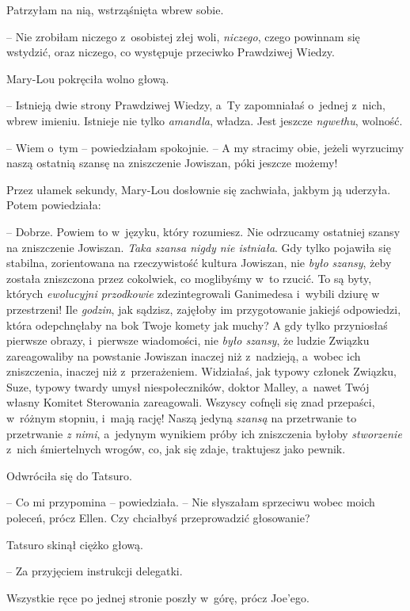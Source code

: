 \documentclass[oneside,polish,11pt,sfheadings]{mwbk}
\begin{document}
Patrzyłam na nią, wstrząśnięta wbrew sobie. 

-- Nie zrobiłam niczego z~osobistej złej woli, \textit{niczego}, czego powinnam się wstydzić, oraz
niczego, co występuje przeciwko Prawdziwej Wiedzy.

Mary-Lou pokręciła wolno głową. 

-- Istnieją dwie strony Prawdziwej
Wiedzy, a~Ty zapomniałaś o~jednej z~nich, wbrew imieniu. Istnieje nie
tylko \textit{amandla}, władza. Jest jeszcze \textit{ngwethu}, wolność.

-- Wiem o~tym -- powiedziałam spokojnie. -- A my stracimy obie, jeżeli
wyrzucimy naszą ostatnią szansę na zniszczenie Jowiszan, póki jeszcze
możemy!

Przez ułamek sekundy, Mary-Lou dosłownie się zachwiała, jakbym ją
uderzyła. Potem powiedziała:

-- Dobrze. Powiem to w~języku, który rozumiesz. Nie odrzucamy ostatniej
szansy na zniszczenie Jowiszan. \textit{Taka szansa nigdy nie istniała}.
Gdy tylko pojawiła się stabilna, zorientowana na rzeczywistość kultura
Jowiszan, nie \textit{było szansy}, żeby została zniszczona przez
cokolwiek, co moglibyśmy w~to rzucić. To są byty, których
\textit{ewolucyjni przodkowie} zdezintegrowali Ganimedesa i~wybili dziurę
w przestrzeni! Ile \textit{godzin}, jak sądzisz, zajęłoby im przygotowanie
jakiejś odpowiedzi, która odepchnęłaby na bok Twoje komety jak muchy? A
gdy tylko przyniosłaś pierwsze obrazy, i~pierwsze wiadomości, nie
\textit{było szansy}, że ludzie Związku zareagowaliby na powstanie
Jowiszan inaczej niż z~nadzieją, a~wobec ich zniszczenia, inaczej niż z~przerażeniem. Widziałaś, jak typowy członek Związku, Suze, typowy twardy
umysł niespołeczników, doktor Malley, a~nawet Twój własny Komitet
Sterowania zareagowali. Wszyscy cofnęli się znad przepaści, w~różnym
stopniu, i~mają rację! Naszą jedyną \textit{szansą} na przetrwanie to
przetrwanie \textit{z nimi}, a~jedynym wynikiem próby ich zniszczenia
byłoby \textit{stworzenie} z~nich śmiertelnych wrogów, co, jak się zdaje,
traktujesz jako pewnik.

Odwróciła się do Tatsuro. 

-- Co mi przypomina -- powiedziała. -- Nie
słyszałam sprzeciwu wobec moich poleceń, prócz Ellen. Czy chciałbyś
przeprowadzić głosowanie?

Tatsuro skinął ciężko głową. 

-- Za przyjęciem instrukcji delegatki.

Wszystkie ręce po jednej stronie poszły w~górę, prócz Joe'ego.
\end{document}
